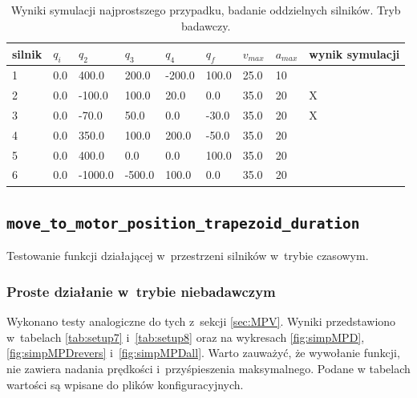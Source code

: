 \documentclass[a4paper, 12pt]{article}
\begin{document}
	\begin{table}[H]
	\centering
	\begin{tabular}{|m{2.5em}|m{3em}|m{3.5em}|m{3em}|m{3em}|m{3em}|m{4em}|m{3em}|m{5em}|}
	\hline
	silnik&$ q_i $ & $ q_2 $ & $ q_3 $ & $q_4$ & $ q_f $ & $ v_{max} $ & $ a_{max} $&wynik symulacji\\
	\hline
	\hline
	\hspace{1em}1& 0.0 & 400.0 & 200.0 & -200.0 & 100.0 & 25.0 & 10&\hspace{2em}\checkmark\\ %
	\hline
	\hspace{1em}2& 0.0 & -100.0 & 100.0 & 20.0 & 0.0 & 35.0 & 20&\hspace{2em}X\\ %
	\hline
	\hspace{1em}3& 0.0 & -70.0 & 50.0 & 0.0 & -30.0 & 35.0 & 20&\hspace{2em}X\\ %
	\hline
	\hspace{1em}4& 0.0 & 350.0 & 100.0 & 200.0 & -50.0 & 35.0 & 20&\hspace{2em}\checkmark\\  %
	\hline
	\hspace{1em}5& 0.0 & 400.0 & 0.0 & 0.0 & 100.0 & 35.0 & 20&\hspace{2em}\checkmark\\  %
	\hline
	\hspace{1em}6& 0.0 & -1000.0 & -500.0 & 100.0 & 0.0 & 35.0 & 20&\hspace{2em}\checkmark\\  %
	\hline
	\end{tabular}
	\caption{Wyniki symulacji najprostszego przypadku, badanie oddzielnych silników. Tryb badawczy.}
	\label{tab:setup6}
	\end{table}	
	
	\subsection{\texttt{move\_to\_motor\_position\_trapezoid\_duration}}
	Testowanie funkcji działającej w~przestrzeni silników w~trybie czasowym.
	\subsubsection{Proste działanie w~trybie niebadawczym}
	Wykonano testy analogiczne do tych z~sekcji \ref{sec:MPV}. Wyniki przedstawiono w~tabelach \ref{tab:setup7} i~\ref{tab:setup8} oraz  na wykresach \ref{fig:simpMPD}, \ref{fig:simpMPDrevers} i~\ref{fig:simpMPDall}. Warto zauważyć, że wywołanie funkcji, nie zawiera nadania prędkości i~przyśpieszenia maksymalnego. Podane w tabelach wartości są wpisane do plików konfiguracyjnych.
\end{document}

